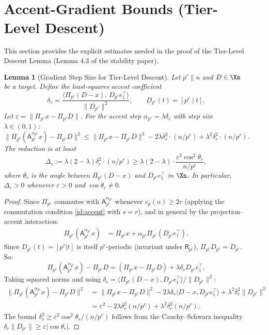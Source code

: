 \documentclass[11pt]{amsart}
\newtheorem{lemma}[theorem]{Lemma}
\newcommand{\Prj}{\Pi}
\newcommand{\Ap}{\mathsf{A}}
\newcommand{\Rp}{\mathsf{R}}
\newcommand{\vp}{v_p}
\newcommand{\norm}[1]{\lVert #1 \rVert}
\begin{document}
\section{Accent-Gradient Bounds (Tier-Level Descent)}
\label{sec:descent}

This section provides the explicit estimates needed in the proof of the Tier-Level Descent Lemma (Lemma 4.3 of the stability paper).

\begin{lemma}[Gradient Step Size for Tier-Level Descent]\label{lem:gradient-step}
Let $p^r \| n$ and $D \in \Xn$ be a target. Define the least-squares accent coefficient
\[
  \delta_r = \frac{\langle \Prj_{p^r}(D - x),\, D_{p^r} e_1^\top\rangle}{\norm{D_{p^r}}^2},
  \qquad D_{p^r}(t) = [p^r \mid t].
\]
Let $\varepsilon = \norm{\Prj_{p^r} x - \Prj_{p^r} D}$. For the accent step $\alpha_{p^r} = \lambda \delta_r$ with step size $\lambda \in (0, 1)$:
\[
  \norm{\Prj_{p^r}(\Ap^{\alpha_{p^r}}_{p^r} x) - \Prj_{p^r} D}^2 \leq \norm{\Prj_{p^r} x - \Prj_{p^r} D}^2 - 2\lambda\delta_r^2 \cdot (n/p^r) + \lambda^2 \delta_r^2 \cdot (n/p^r).
\]
The reduction is at least
\[
  \Delta_r := \lambda(2 - \lambda)\delta_r^2 \cdot (n/p^r) \geq \lambda(2-\lambda) \cdot \frac{\varepsilon^2 \cos^2\theta_r}{n/p^r},
\]
where $\theta_r$ is the angle between $\Prj_{p^r}(D-x)$ and $D_{p^r} e_1^\top$ in $\Xn$. In particular, $\Delta_r > 0$ whenever $\varepsilon > 0$ and $\cos\theta_r \neq 0$.
\end{lemma}

\begin{proof}
Since $\Prj_{p^r}$ commutes with $\Ap^{\alpha_{p^r}}_{p^r}$ whenever $\vp(n) \geq 2r$ (applying the commutation condition \eqref{id:accent} with $s = r$), and in general by the projection–accent interaction:
\begin{align*}
  \Prj_{p^r}(\Ap^{\alpha_{p^r}}_{p^r} x) &= \Prj_{p^r} x + \alpha_{p^r} \Prj_{p^r}(D_{p^r} e_1^\top).
\end{align*}
Since $D_{p^r}(t) = [p^r|t]$ is itself $p^r$-periodic (invariant under $\Rp_{p^r}$), $\Prj_{p^r} D_{p^r} = D_{p^r}$. So:
\[
  \Prj_{p^r}(\Ap^{\alpha_{p^r}}_{p^r} x) - \Prj_{p^r} D = (\Prj_{p^r} x - \Prj_{p^r} D) + \lambda\delta_r D_{p^r} e_1^\top.
\]
Taking squared norms and using $\delta_r = \langle \Prj_{p^r}(D-x), D_{p^r}e_1^\top\rangle / \norm{D_{p^r}}^2$:
\begin{align*}
  \norm{\Prj_{p^r}(\Ap^{\alpha_{p^r}}_{p^r} x) - \Prj_{p^r} D}^2
  &= \norm{\Prj_{p^r} x - \Prj_{p^r} D}^2 - 2\lambda\delta_r \langle D-x, D_{p^r}e_1^\top\rangle + \lambda^2\delta_r^2 \norm{D_{p^r}}^2 \\
  &= \varepsilon^2 - 2\lambda\delta_r^2(n/p^r) + \lambda^2\delta_r^2(n/p^r).
\end{align*}
The bound $\delta_r^2 \geq \varepsilon^2 \cos^2\theta_r / (n/p^r)$ follows from the Cauchy–Schwarz inequality $\delta_r \norm{D_{p^r}} \geq \varepsilon |\cos\theta_r|$.
\end{proof}
\end{document}

